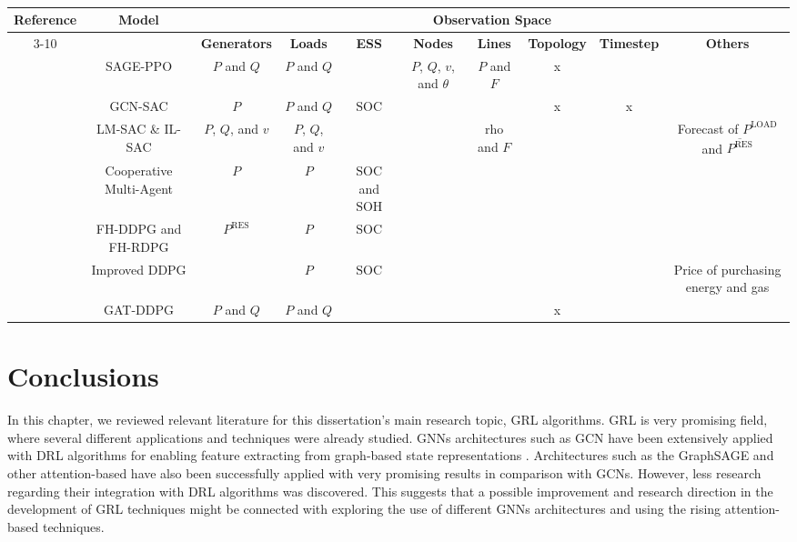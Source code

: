   \begin{sidewaystable}[h!]
	\centering
	\caption{}
	\begin{tabular}{cccccccccc}
		\toprule
		\multirow{3}{*}{\textbf{Reference}} & \multirow{3}{*}{\textbf{Model}} & \multicolumn{8}{c}{\textbf{Observation Space}} \\ 
		\cmidrule(lr){3-10}
		&  &  \textbf{Generators} & \textbf{Loads} & \textbf{ESS} & \textbf{Nodes} & \textbf{Lines} & \textbf{Topology} & \textbf{Timestep} & \textbf{Others}\\ 
		\midrule
		\cite{zhaoGraphbasedDeepReinforcement2022} & SAGE-PPO & $P$ and $Q$  & $P$ and $Q$ & & $P$, $Q$, $v$, and $\theta$ & $P$ and $F$ & x & & \\
		\cite{liNovelGraphReinforcement2022, chenScalableGraphReinforcement2023} & GCN-SAC & $P$ & $P$ and $Q$ & $\text{SOC}$ & & & x & x & \\
		\cite{hanAutonomousControlTechnology2023} & LM-SAC \& IL-SAC & $P$, $Q$, and $v$ & $P$, $Q$, and $v$ & & & $\text{rho}$ and $F$ & & & Forecast of $P^\text{LOAD}$ and $\overline{P^\text{RES}}$\\
		\cite{liuDistributedEconomicDispatch2018} &  Cooperative Multi-Agent & $P$ & $P$ & $\text{SOC}$ and $\text{SOH}$ & & & & & \\
		\cite{leiDynamicEnergyDispatch2021} & FH-DDPG and FH-RDPG & $P^\text{RES}$ & $P$ & $\text{SOC}$ & & & & & \\
		\cite{yangDynamicEnergyDispatch2021} & Improved DDPG & & $P$ & $\text{SOC}$ & & & & &  Price of purchasing energy and gas \\
		\cite{xingRealtimeOptimalScheduling2023} & GAT-DDPG & $P$ and $Q$ & $P$ and $Q$ & & & & x &  & \\
		\bottomrule
	\end{tabular}
	\label{tab:ded-obs}
\end{sidewaystable}

\section{Conclusions} \label{sec:review-conclusion}

In this chapter, we reviewed relevant literature for this dissertation's main research topic, \ac{GRL} algorithms. \ac{GRL} is very promising field, where several different applications and techniques were already studied. \acp{GNN} architectures such as \ac{GCN} have been extensively applied with DRL algorithms for enabling feature extracting from graph-based state representations \cite{chenScalableGraphReinforcement2023, chenAutonomousExplorationUncertainty2020}. Architectures such as the GraphSAGE and other attention-based have also been successfully applied with very promising results \cite{peiEmergencyControlStrategy2023, xingRealtimeOptimalScheduling2023} in comparison with \acp{GCN}. However, less research regarding their integration with \ac{DRL} algorithms was discovered. This suggests that a possible improvement and research direction in the development of \ac{GRL} techniques might be connected with exploring the use of different \acp{GNN} architectures and using the rising attention-based techniques.


